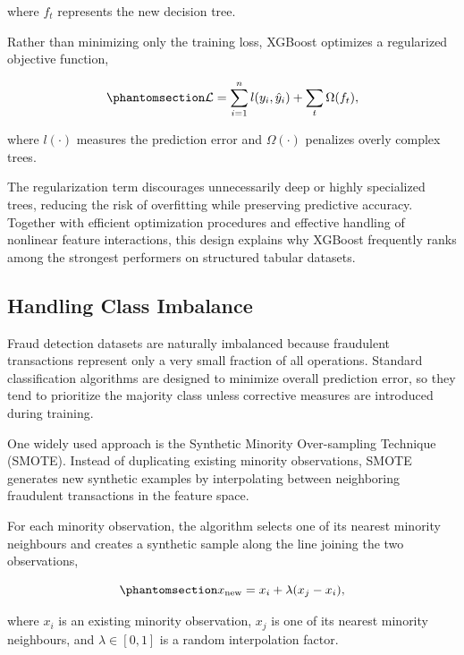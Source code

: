 \documentclass[
  12pt,
  letterpaper,
]{book}
\begin{document}
where \(f_t\) represents the new decision tree.

Rather than minimizing only the training loss, XGBoost optimizes a
regularized objective function,

\begin{equation}\phantomsection\label{eq-xgb-objective}{
\mathcal{L}=\sum_{i=1}^{n}l(y_i,\hat{y}_i)+\sum_{t}\Omega(f_t),
}\end{equation}

where \(l(\cdot)\) measures the prediction error and \(\Omega(\cdot)\)
penalizes overly complex trees.

The regularization term discourages unnecessarily deep or highly
specialized trees, reducing the risk of overfitting while preserving
predictive accuracy. Together with efficient optimization procedures and
effective handling of nonlinear feature interactions, this design
explains why XGBoost frequently ranks among the strongest performers on
structured tabular datasets.

\subsection{Handling Class Imbalance}\label{handling-class-imbalance}

Fraud detection datasets are naturally imbalanced because fraudulent
transactions represent only a very small fraction of all operations.
Standard classification algorithms are designed to minimize overall
prediction error, so they tend to prioritize the majority class unless
corrective measures are introduced during training.

One widely used approach is the Synthetic Minority Over-sampling
Technique (SMOTE). Instead of duplicating existing minority
observations, SMOTE generates new synthetic examples by interpolating
between neighboring fraudulent transactions in the feature space.

For each minority observation, the algorithm selects one of its nearest
minority neighbours and creates a synthetic sample along the line
joining the two observations,

\begin{equation}\phantomsection\label{eq-smote-synthetic-sample}{
x_{\mathrm{new}}=x_i+\lambda(x_j-x_i),
}\end{equation}

where \(x_i\) is an existing minority observation, \(x_j\) is one of its
nearest minority neighbours, and \(\lambda\in[0,1]\) is a random
interpolation factor.
\end{document}
